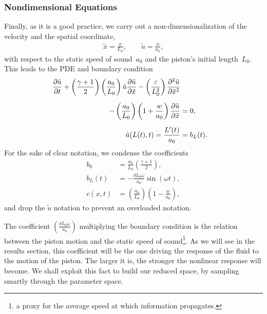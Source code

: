 \documentclass[../../thesis.tex]{subfiles}
\begin{document}
\subsubsection{Nondimensional Equations}
Finally, as it is a good practice, 
we carry out a non-dimensionalization of the velocity and the spatial coordinate,
\begin{subequations}
    \begin{align}
        \tilde{x} = \frac{x}{L_0}, \qquad \tilde{u} = \frac{u}{a_0},
    \end{align}
\end{subequations}
with respect to the static speed of sound~$a_0$ and the piston's initial length~$L_0$.
This leads to the PDE and boundary condition
\begin{subequations}
    \begin{align}
        \pdv{\tilde{u}}{t} 
        + \left(\frac{\gamma+1}{2}\right)\left(\frac{a_0}{L_0}\right) \tilde{u} \pdv{\tilde{u}}{\tilde{x}}
        - \left(\frac{\varepsilon}{L_0^2}\right) \pdv[2]{\tilde{u}}{\tilde{x}}
        \nonumber
        \\[2mm]
        - \left(\frac{a_0}{L_0}\right)\left(1 + \frac{w}{a_0}\right)\pdv{\tilde{u}}{\tilde{x}}
         &= 0, 
        \\[2mm]
        \tilde{u}(L(t),t) = \frac{L'(t)}{a_0} &= b_L(t).
    \end{align}    
\end{subequations}
For the sake of clear notation, we condense the coefficients 
\begin{subequations}
    \begin{align}
        b_0    &= \frac{a_0}{L_0} \left(\frac{\gamma+1}{2}\right), 
        \\[2mm]
        b_L(t) &= - \frac{\delta L_0 \omega}{a_0} \sin(\omega t),
        \\[2mm]
        c(x,t) &= \left(\frac{a_0}{L_0}\right)\left(1 - \frac{w}{a_0}\right),
    \end{align}
\end{subequations}
and drop the $\tilde{u}$ notation to prevent an overloaded notation.

The coefficient $\left(\frac{\delta L_0 \omega}{a_0}\right)$ multiplying the boundary condition
is the relation between the piston motion and the static speed of sound\footnote{a proxy for the average speed at which information propagates.}.
As we will see in the results section, this coefficient will be the one driving the response of the fluid to the motion of the piston.
The larger it is, the stronger the nonlinear response will become. 
We shall exploit this fact to build our reduced space, by sampling smartly through the parameter space.
\end{document}
